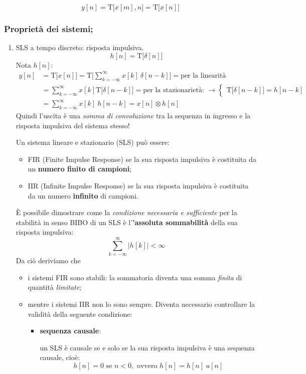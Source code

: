 \documentclass[
]{article}
\providecommand{\tightlist}{%
  \setlength{\itemsep}{0pt}\setlength{\parskip}{0pt}}
\begin{document}
\[
y[n] = \text{T}\Big[x[m], n\Big] = \text{T}\Big[x[n] \Big]
\]

\subsubsection{Proprietà dei sistemi;}\label{proprietuxe0-dei-sistemi}

\begin{enumerate}
\def\labelenumi{\arabic{enumi}.}
\setcounter{enumi}{25}
\item
  SLS a tempo discreto: risposta impulsiva. \[
  h[n] = \text{T}\Big[ \delta[n] \Big]
  \] Nota \(h[n]\): \begin{align*}
  y[n] &= \text{T}\Big[ x[n] \Big] = \text{T}\Big[ \sum_{k=-\infty}^{\infty}x[k] \ \delta[n-k] \Big] = \text{per la linearità} \\
  &= \sum_{k=-\infty}^{\infty}x[k] \text{T}\Big[ \delta[n-k] \Big] = \text{per la stazionarietà: } \to
  \left \{\begin{array}{cl}
  \text{T}\Big[ \delta[n-k] \Big]=h[n-k]
  \end{array}\right. \\
  &= \sum_{k=-\infty}^{\infty}x[k] \ h[n-k] = x[n] \otimes h[n]
  \end{align*} Quindi l'uscita è una \emph{somma di convoluzione} tra la
  sequenza in ingresso e la risposta impulsiva del sistema stesso!

  Un sistema lineare e stazionario (SLS) può essere:

  \begin{itemize}
  \tightlist
  \item
    FIR (Finite Impulse Response) se la sua risposta impulsiva è
    costituita da un \textbf{numero finito di campioni};
  \item
    IIR (Infinite Impulse Response) se la sua risposta impulsiva è
    costituita da un numero \textbf{infinito} di campioni.
  \end{itemize}

  È possibile dimostrare come la \emph{condizione necessaria e
  sufficiente} per la stabilità in senso BIBO di un SLS è
  l'\textbf{'assoluta sommabilità} della sua risposta impulsiva: \[
  \sum_{k=-\infty}^{\infty} \Big| h[k] \Big| < \infty
  \] Da ciò deriviamo che

  \begin{itemize}
  \tightlist
  \item
    i sistemi FIR sono stabili: la sommatoria diventa una somma
    \emph{finita} di quantità \emph{limitate};
  \item
    mentre i sistemi IIR non lo sono sempre. Diventa necessario
    controllare la validità della seguente condizione:

    \begin{itemize}
    \item
      \textbf{sequenza causale}:

      un SLS è causale se e solo se la sua risposta impulsiva è una
      sequenza causale, cioè: \[
        h[n] = 0 \text{ se } n<0, \text{ ovvero } h[n] = h[n] \ u[n] 
        \]
    \end{itemize}
  \end{itemize}
\end{enumerate}
\end{document}
